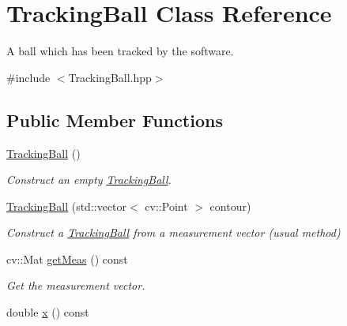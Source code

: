 \hypertarget{classTrackingBall}{}\section{Tracking\+Ball Class Reference}
\label{classTrackingBall}


A ball which has been tracked by the software.  




{\ttfamily \#include $<$Tracking\+Ball.\+hpp$>$}

\subsection*{Public Member Functions}
\begin{DoxyCompactItemize}
\item 
\hyperlink{classTrackingBall_a6b355915eacf7476217573764ecee6b1}{Tracking\+Ball} ()\hypertarget{classTrackingBall_a6b355915eacf7476217573764ecee6b1}{}\label{classTrackingBall_a6b355915eacf7476217573764ecee6b1}

\begin{DoxyCompactList}\small\item\em Construct an empty \hyperlink{classTrackingBall}{Tracking\+Ball}. \end{DoxyCompactList}\item 
\hyperlink{classTrackingBall_a87b81fdf513c23d511109b7b927f60a5}{Tracking\+Ball} (std\+::vector$<$ cv\+::\+Point $>$ contour)\hypertarget{classTrackingBall_a87b81fdf513c23d511109b7b927f60a5}{}\label{classTrackingBall_a87b81fdf513c23d511109b7b927f60a5}

\begin{DoxyCompactList}\small\item\em Construct a \hyperlink{classTrackingBall}{Tracking\+Ball} from a measurement vector (usual method) \end{DoxyCompactList}\item 
cv\+::\+Mat \hyperlink{classTrackingBall_aa1fc6e253dbabd744d6e6c46ed497237}{get\+Meas} () const \hypertarget{classTrackingBall_aa1fc6e253dbabd744d6e6c46ed497237}{}\label{classTrackingBall_aa1fc6e253dbabd744d6e6c46ed497237}

\begin{DoxyCompactList}\small\item\em Get the measurement vector. \end{DoxyCompactList}\item 
double \hyperlink{classTrackingBall_afaca54e4337a6ca1ddd43c9c9879c59c}{x} () const \hypertarget{classTrackingBall_afaca54e4337a6ca1ddd43c9c9879c59c}{}\label{classTrackingBall_afaca54e4337a6ca1ddd43c9c9879c59c}


\end{DoxyCompactItemize}
